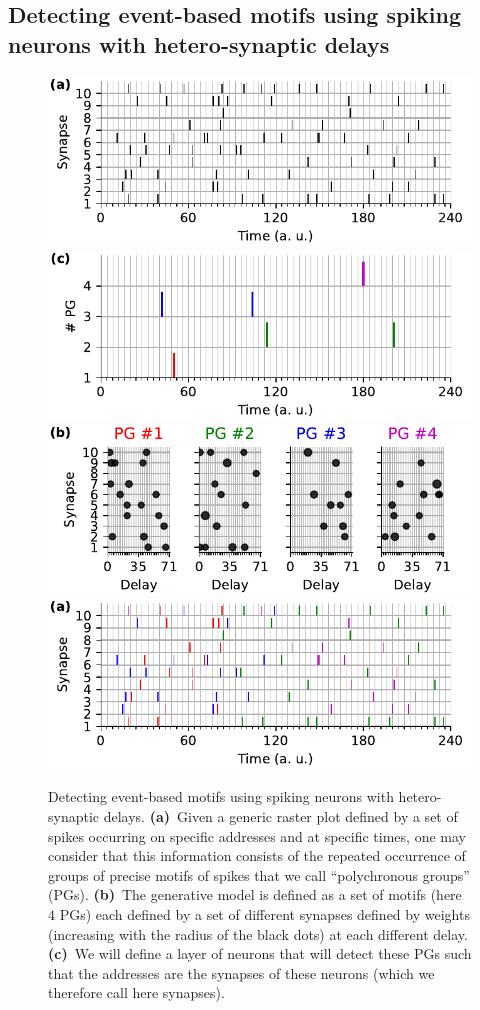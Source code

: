 \documentclass[default]{sn-jnl}%
\theoremstyle{thmstyleone}%
\theoremstyle{thmstyletwo}%
\theoremstyle{thmstylethree}%
\begin{document}
\subsection{Detecting event-based motifs using spiking neurons with hetero-synaptic delays}%
%
\begin{figure}[t!]
    \centering
    \includegraphics[width=0.490\linewidth]{figures/figure_1a_k.pdf}
    \includegraphics[width=0.490\linewidth]{figures/figure_1c.pdf}
    \includegraphics[width=0.490\linewidth]{figures/figure_1b.pdf}
    \includegraphics[width=0.490\linewidth]{figures/figure_1a.pdf}
	    \caption{Detecting event-based motifs using spiking neurons with hetero-synaptic delays. 
	    {\bf (a)}~Given a generic raster plot defined by a set of spikes occurring on specific addresses and at specific times, one may consider that this information consists of the repeated occurrence of groups of precise motifs of spikes that we call ``polychronous groups'' (PGs). 
	    {\bf (b)}~The generative model is defined as a set of motifs (here $4$ PGs) each defined by a set of different synapses defined by weights (increasing with the radius of the black dots) at each different delay. 
	    {\bf (c)}~We will define a layer of neurons that will detect these PGs such that the addresses are the synapses of these neurons (which we therefore call here synapses).
}
\end{figure}
\end{document}
